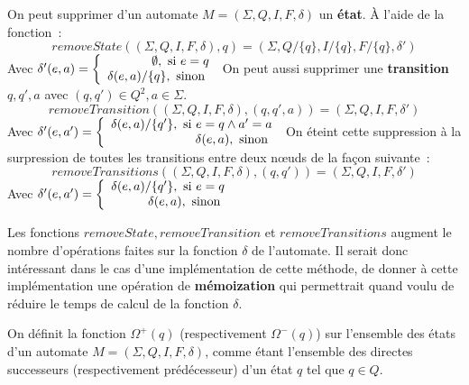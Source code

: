 \begin{Definition}
  On peut supprimer d'un automate \(M = (\Sigma, Q, I, F, \delta)\) un 
  \textbf{état}. À l'aide de la fonction~:
  \[
    removeState((\Sigma, Q, I, F, \delta), q) = (\Sigma, Q/\{q\}, I/\{q\}, 
    F/\{q\}, \delta') 
  \]
  Avec \(\delta'(e, a) = \left \{
    \begin{array}{r c l}
      \emptyset, \text{ si } e = q\\
      \delta(e, a)/\{q\}, \text{ sinon } \\
    \end{array}
    \right . \)
  On peut aussi supprimer une \textbf{transition} \(q, q', a\) avec \((q, q') 
  \in Q^2, a \in \Sigma\). 
  \[
    removeTransition((\Sigma, Q, I, F, \delta), (q, q', a)) = 
    (\Sigma, Q, I, F, \delta')
  \]
  Avec \(\delta'(e, a') = \left \{
    \begin{array}{r c l}
      \delta(e, a)/\{q'\}, \text{ si } e = q \land a' = a\\
      \delta(e, a), \text{ sinon } \\
    \end{array}
    \right .\)
  On éteint cette suppression à la surpression de toutes les transitions entre 
  deux n\oe uds de la façon suivante~:
  \[
    removeTransitions((\Sigma, Q, I, F, \delta), (q, q')) =
    (\Sigma, Q, I, F, \delta')
  \]
  Avec \(\delta'(e, a') = \left \{
    \begin{array}{r c l}
      \delta(e, a)/\{q'\}, \text{ si } e = q\\
      \delta(e, a), \text{ sinon } \\
    \end{array}
    \right .\)
\end{Definition}

\begin{Remark}
  Les fonctions \(removeState, removeTransition\) et \(removeTransitions\)
  augment le nombre d'opérations faites sur la fonction \(\delta\) de 
  l'automate. Il serait donc intéressant dans le cas d'une implémentation de 
  cette méthode, de donner à cette implémentation une opération de 
  \textbf{mémoization} qui permettrait quand voulu de réduire le temps de calcul 
  de la fonction \(\delta\).
\end{Remark}

\begin{Definition}
  On définit la fonction \(\Omega^{+}(q)\) (respectivement \(\Omega^{-}(q)\)) 
  sur l'ensemble des états d'un automate \(M = (\Sigma, Q, I, F, \delta)\), 
  comme étant l'ensemble des directes successeurs (respectivement prédécesseur) 
  d'un état \(q\) tel que \(q \in Q\).
\end{Definition}

